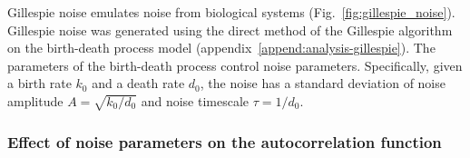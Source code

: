Gillespie noise emulates noise from biological systems (Fig.\ \ref{fig:gillespie_noise}).
Gillespie noise was generated using the direct method of the Gillespie algorithm \parencite{gillespieExactStochasticSimulation1977} on the birth-death process model (appendix~\ref{append:analysis-gillespie}).
The parameters of the birth-death process control noise parameters.
Specifically, given a birth rate $k_{0}$ and a death rate $d_{0}$, the noise has a standard deviation of noise amplitude $A = \sqrt{k_{0}/d_{0}}$ and noise timescale $\tau = 1/d_{0}$.


\subsubsection{Effect of noise parameters on the autocorrelation function}
\label{subsubsec:analysis-characterisation-acf-sinusoid}


